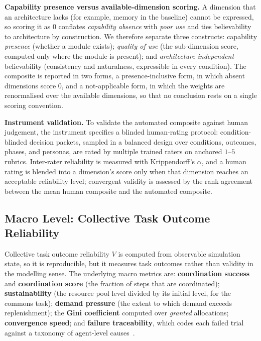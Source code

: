 \documentclass[runningheads]{llncs}
\begin{document}
\textbf{Capability presence versus available-dimension scoring.} A dimension that an
architecture lacks (for example, memory in the baseline) cannot be expressed, so scoring it as
$0$ conflates \emph{capability absence} with \emph{poor use} and ties believability to
architecture by construction. We therefore separate three constructs: capability \emph{presence}
(whether a module exists); \emph{quality of use} (the sub-dimension score, computed only where
the module is present); and \emph{architecture-independent} believability (consistency and
naturalness, expressible in every condition). The composite is reported in two forms, a
presence-inclusive form, in which absent dimensions score $0$, and a not-applicable form, in
which the weights are renormalised over the available dimensions, so that no conclusion rests
on a single scoring convention.

\textbf{Instrument validation.} To validate the automated composite against human judgement, the
instrument specifies a blinded human-rating protocol: condition-blinded decision packets,
sampled in a balanced design over conditions, outcomes, phases, and personas, are rated by
multiple trained raters on anchored $1$--$5$ rubrics. Inter-rater reliability is measured with
Krippendorff's $\alpha$, and a human rating is blended into a dimension's score only when that
dimension reaches an acceptable reliability level; convergent validity is assessed by the rank
agreement between the mean human composite and the automated composite.




\subsection{Macro Level: Collective Task Outcome Reliability}\label{sec:macro}
Collective task outcome reliability $V$ is computed from observable simulation state, so it is
reproducible, but it measures task outcomes rather than validity in the modelling sense. The
underlying macro metrics are: \textbf{coordination success} and \textbf{coordination score} (the
fraction of steps that are coordinated); \textbf{sustainability} (the resource pool level divided
by its initial level, for the commons task); \textbf{demand pressure} (the extent to which demand
exceeds replenishment); the \textbf{Gini coefficient} computed over \emph{granted} allocations;
\textbf{convergence speed}; and \textbf{failure traceability}, which codes each failed trial
against a taxonomy of agent-level causes~\cite{cemri2025fails}.
\end{document}
